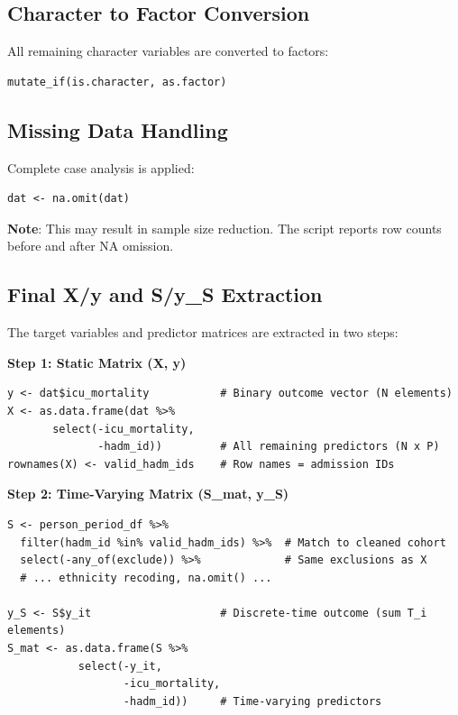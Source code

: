 \documentclass[11pt]{article}
\begin{document}
\subsection{Character to Factor Conversion}

All remaining character variables are converted to factors:

\begin{verbatim}
mutate_if(is.character, as.factor)
\end{verbatim}

\subsection{Missing Data Handling}

Complete case analysis is applied:

\begin{verbatim}
dat <- na.omit(dat)
\end{verbatim}

\textbf{Note}: This may result in sample size reduction. The script reports row counts before and after NA omission.

\subsection{Final X/y and S/y\_S Extraction}
\label{sec:exclusions}

The target variables and predictor matrices are extracted in two steps:

\textbf{Step 1: Static Matrix (X, y)}
\begin{verbatim}
y <- dat$icu_mortality           # Binary outcome vector (N elements)
X <- as.data.frame(dat %>%
       select(-icu_mortality,
              -hadm_id))         # All remaining predictors (N x P)
rownames(X) <- valid_hadm_ids    # Row names = admission IDs
\end{verbatim}

\textbf{Step 2: Time-Varying Matrix (S\_mat, y\_S)}
\begin{verbatim}
S <- person_period_df %>%
  filter(hadm_id %in% valid_hadm_ids) %>%  # Match to cleaned cohort
  select(-any_of(exclude)) %>%             # Same exclusions as X
  # ... ethnicity recoding, na.omit() ...

y_S <- S$y_it                    # Discrete-time outcome (sum T_i elements)
S_mat <- as.data.frame(S %>%
           select(-y_it,
                  -icu_mortality,
                  -hadm_id))     # Time-varying predictors
\end{verbatim}
\end{document}
